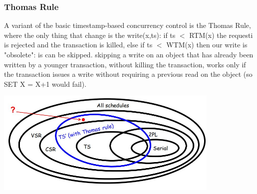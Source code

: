 \subsubsection{Thomas Rule}
A variant of the basic timestamp-based concurrency control is the Thomas Rule, where the only thing that change is the write(x,ts): if ts $<$ RTM(x) the requesti is rejected and the transaction is killed, else if ts $<$ WTM(x) then our write is "obsolete": is can be skipped.\newline
\newline
skipping a write on an object that has already been written
by a younger transaction, without killing the transaction, works only if the transaction issues a write without requiring a previous
read on the object (so SET X = X+1 would fail).
\begin{center}
    \includegraphics[height=5cm]{../arguments/thomasrule.JPG}
\end{center}
